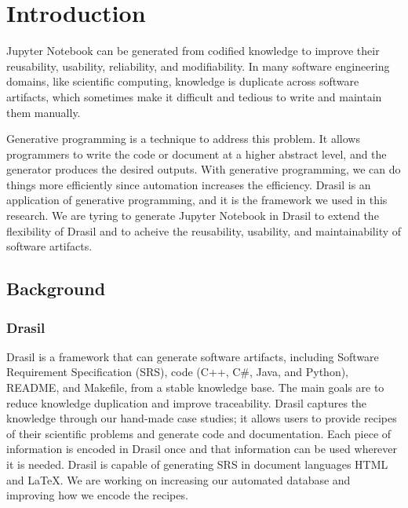 \chapter{Introduction}

Jupyter Notebook can be generated from codified knowledge to improve their 
reusability, usability, reliability, and modifiability. In many software 
engineering domains, like scientific computing, knowledge is duplicate across 
software artifacts, which sometimes make it difficult and tedious to write 
and maintain them manually. 

Generative programming is a technique to address this problem. It allows 
programmers to write the code or document at a higher abstract level, and the 
generator produces the desired outputs. With generative programming, we can do 
things more efficiently since automation increases the efficiency. Drasil is an 
application of generative programming, and it is the framework we used in this 
research. We are tyring to generate Jupyter Notebook in Drasil to extend the 
flexibility of Drasil and to acheive the reusability, usability, and 
maintainability of software artifacts. 

\section{Background}
\subsection{Drasil}
Drasil is a framework that can generate software artifacts, including Software 
Requirement Specification (SRS), code (C++, C\#, Java, and Python), README, and 
Makefile, from a stable knowledge base. The main goals are to reduce knowledge 
duplication and improve traceability. Drasil captures the knowledge through our 
hand-made case studies; it allows users to provide recipes of their scientific 
problems and generate code and documentation. Each piece of information is 
encoded in Drasil once and that information can be used wherever it is needed. 
Drasil is capable of generating SRS in document languages HTML and LaTeX. We 
are working on increasing our automated database and improving how we encode 
the recipes.

